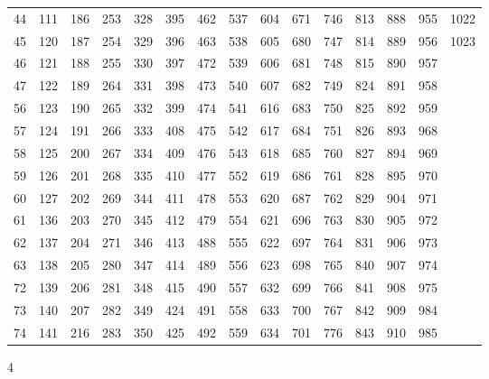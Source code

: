 \documentclass{assignment}
\begin{document}
\begin{tabular}{r r r r r r r r r r r r r r r}
44 & 111 & 186 & 253 & 328 & 395 & 462 & 537 & 604 & 671 & 746 & 813 & 888 & 955 & 1022 \\
45 & 120 & 187 & 254 & 329 & 396 & 463 & 538 & 605 & 680 & 747 & 814 & 889 & 956 & 1023 \\
46 & 121 & 188 & 255 & 330 & 397 & 472 & 539 & 606 & 681 & 748 & 815 & 890 & 957 \\
47 & 122 & 189 & 264 & 331 & 398 & 473 & 540 & 607 & 682 & 749 & 824 & 891 & 958 \\
56 & 123 & 190 & 265 & 332 & 399 & 474 & 541 & 616 & 683 & 750 & 825 & 892 & 959 \\
57 & 124 & 191 & 266 & 333 & 408 & 475 & 542 & 617 & 684 & 751 & 826 & 893 & 968 \\
58 & 125 & 200 & 267 & 334 & 409 & 476 & 543 & 618 & 685 & 760 & 827 & 894 & 969 \\
59 & 126 & 201 & 268 & 335 & 410 & 477 & 552 & 619 & 686 & 761 & 828 & 895 & 970 \\
60 & 127 & 202 & 269 & 344 & 411 & 478 & 553 & 620 & 687 & 762 & 829 & 904 & 971 \\
61 & 136 & 203 & 270 & 345 & 412 & 479 & 554 & 621 & 696 & 763 & 830 & 905 & 972 \\
62 & 137 & 204 & 271 & 346 & 413 & 488 & 555 & 622 & 697 & 764 & 831 & 906 & 973 \\
63 & 138 & 205 & 280 & 347 & 414 & 489 & 556 & 623 & 698 & 765 & 840 & 907 & 974 \\
72 & 139 & 206 & 281 & 348 & 415 & 490 & 557 & 632 & 699 & 766 & 841 & 908 & 975 \\
73 & 140 & 207 & 282 & 349 & 424 & 491 & 558 & 633 & 700 & 767 & 842 & 909 & 984 \\
74 & 141 & 216 & 283 & 350 & 425 & 492 & 559 & 634 & 701 & 776 & 843 & 910 & 985 \\
\end{tabular}
\newpage


4\\
\\
\end{document}
